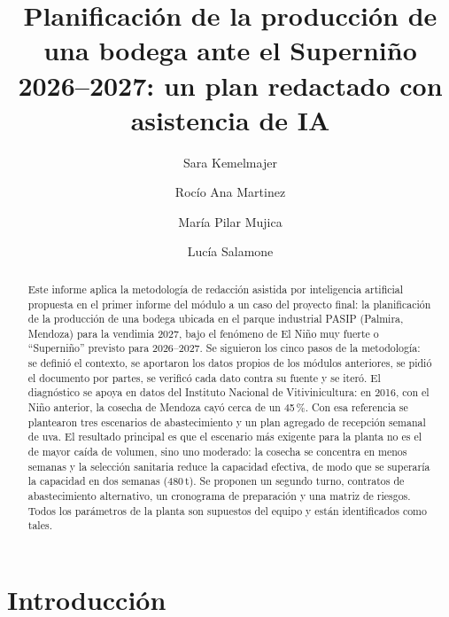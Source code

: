 \documentclass[runningheads]{llncs}
\begin{document}
\title{Planificación de la producción de una bodega ante el Superniño 2026--2027: un plan redactado con asistencia de IA}

\author{Sara Kemelmajer \and Rocío Ana Martinez \and María Pilar Mujica \and Lucía Salamone}


\maketitle

\begin{abstract}
Este informe aplica la metodología de redacción asistida por inteligencia artificial propuesta en el primer informe del módulo a un caso del proyecto final: la planificación de la producción de una bodega ubicada en el parque industrial PASIP (Palmira, Mendoza) para la vendimia 2027, bajo el fenómeno de El Niño muy fuerte o ``Superniño'' previsto para 2026--2027. Se siguieron los cinco pasos de la metodología: se definió el contexto, se aportaron los datos propios de los módulos anteriores, se pidió el documento por partes, se verificó cada dato contra su fuente y se iteró. El diagnóstico se apoya en datos del Instituto Nacional de Vitivinicultura: en 2016, con el Niño anterior, la cosecha de Mendoza cayó cerca de un 45\,\%. Con esa referencia se plantearon tres escenarios de abastecimiento y un plan agregado de recepción semanal de uva. El resultado principal es que el escenario más exigente para la planta no es el de mayor caída de volumen, sino uno moderado: la cosecha se concentra en menos semanas y la selección sanitaria reduce la capacidad efectiva, de modo que se superaría la capacidad en dos semanas (480\,t). Se proponen un segundo turno, contratos de abastecimiento alternativo, un cronograma de preparación y una matriz de riesgos. Todos los parámetros de la planta son supuestos del equipo y están identificados como tales.

\end{abstract}

\section{Introducción}
\end{document}
